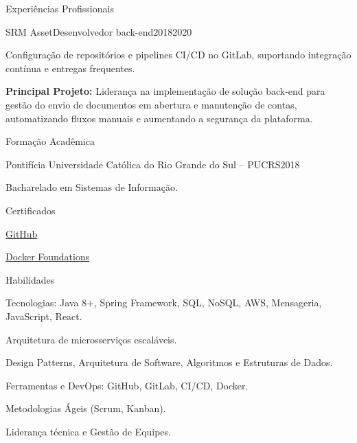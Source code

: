 \documentclass{domingosfelipe-resume}
\begin{document}
\begin{rSection}{Experiências Profissionais}
\begin{rExperienceSubsection}{SRM Asset}{Desenvolvedor back-end}{2018}{2020}
        \item Configuração de repositórios e pipelines CI/CD no GitLab, suportando integração contínua e entregas frequentes.
        \item \textbf{Principal Projeto:} Liderança na implementação de solução back-end para gestão do envio de documentos em abertura e manutenção de contas, automatizando fluxos manuais e aumentando a segurança da plataforma.
        \end{rExperienceSubsection}
    \end{rSection}
    
    \begin{rSection}{Formação Acadêmica}
        \begin{rEducationSubsection}{Pontifícia Universidade Católica do Rio Grande do Sul – PUCRS}{2018}    
            \item Bacharelado em Sistemas de Informação.
        \end{rEducationSubsection}
    \end{rSection}
    
    \begin{rSection}{Certificados}
        \begin{rSkillsSubsection}
            \item \href{https://www.linkedin.com/learning/certificates/3781e6e11a2fe389fcb48387012853f893c2bdbc3decd7c57790c2c850c316be?trk=share_certificate}{GitHub}
            \item \href{https://www.linkedin.com/learning/certificates/bd30b94ff1b980132e44f68668e4a1c56b9fddb10832c9c01d9d65ce7d2b9c62?trk=share_certificate}{Docker Foundations}
        \end{rSkillsSubsection}
    \end{rSection}
    
    \begin{rSection}{Habilidades}
        \begin{rSkillsSubsection}
            \item Tecnologias: Java 8+, Spring Framework, SQL, NoSQL, AWS, Mensageria, JavaScript, React.
            \item Arquitetura de microsserviços escaláveis.
            \item Design Patterns, Arquitetura de Software, Algoritmos e Estruturas de Dados.
            \item Ferramentas e DevOps: GitHub, GitLab, CI/CD, Docker.
            \item Metodologias Ágeis (Scrum, Kanban).
            \item Liderança técnica e Gestão de Equipes.
        \end{rSkillsSubsection}
    \end{rSection}
\end{document}
